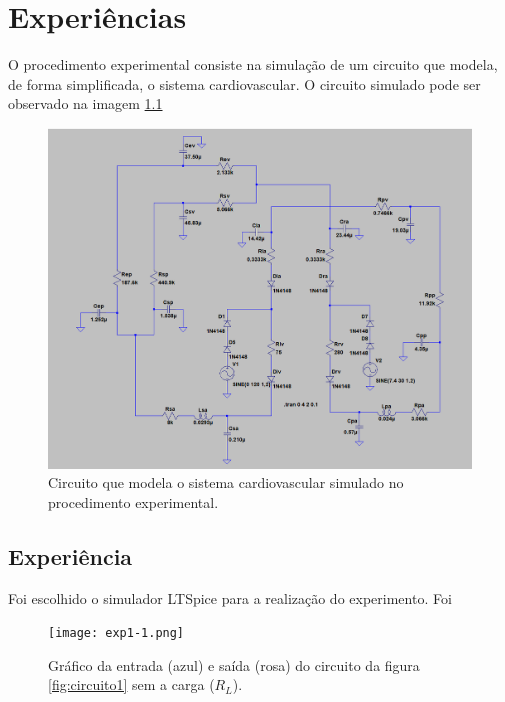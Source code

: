 \documentclass{abntex2}
\begin{document}
\imprimircapa
\imprimirfolhaderosto

\tableofcontents
\listoffigures
\clearpage

\chapter{Experiências}

O procedimento experimental consiste na simulação de um circuito que modela, de forma simplificada, o sistema cardiovascular. O circuito simulado pode ser observado na
imagem \ref{fig:circuitop}

\begin{figure}[h]
  \centering
  \includegraphics[scale = 0.7]{circuitop.png}
  \caption{Circuito que modela o sistema cardiovascular simulado no procedimento experimental.}
  \label{fig:circuitop}
\end{figure}


\section{Experiência}

Foi escolhido o simulador LTSpice para a realização do experimento. Foi

\begin{figure}[h]
  \centering
  \texttt{[image: exp1-1.png]}
  \caption{Gráfico da entrada (azul) e saída (rosa) do circuito da figura \ref{fig:circuito1} sem a carga ($R_L$).}
  \label{fig:io1}
\end{figure}
\end{document}
